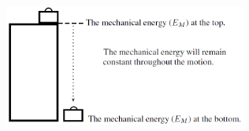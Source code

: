     \setcounter{subfigure}{0}


	\begin{figure}[H] %
    \begin{center}
    \label{m38786*id68723!!!underscore!!!media}\label{m38786*id68723!!!underscore!!!printimage}\includegraphics[width=300px]{col11305.imgs/m38786_PG10C3_009.png} %
        
      \vspace{2pt}
    \vspace{.1in}
    
    \end{center}

 \end{figure}   

    \addtocounter{footnote}{-0}
    
